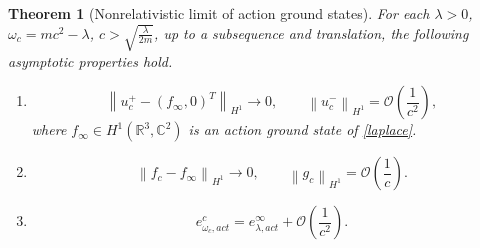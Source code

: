 \documentclass{amsart}
\theoremstyle{plain}
\newtheorem{theorem}{Theorem}[section]
\theoremstyle{definition}
\theoremstyle{remark}
\numberwithin{equation}{section} \numberwithin{figure}{section}
\begin{document}
\begin{theorem}[Nonrelativistic limit of  action ground states]\label{them:1.3}
  \normalfont
  For each $\lambda>0$, $\omega_c= mc^2-\lambda$, $c>\sqrt{\frac{\lambda}{2m}}$, up to a subsequence and translation, the following asymptotic properties hold.
   \begin{enumerate}
    \item 
   \[
  \left\|u_c^+ - (f_\infty, 0)^T\right\|_{H^1} \to 0, \qquad \left\|u_c^-\right\|_{H^1} = \mathcal{O}\left(\frac{1}{c^2}\right),
  \] 
  where \(f_\infty\in H^1(\mathbb{R}^3, \mathbb{C}^2)\) is an action ground state of \eqref{laplace}.
  \item 
  \[
  \left\|f_c - f_\infty\right\|_{H^1} \to 0, \qquad \left\|g_c\right\|_{H^1} = \mathcal{O}\left(\frac{1}{c}\right).
  \]
  \item 
  $$
  e_{\omega_c, act}^c = e_{\lambda, act}^\infty+ \mathcal{O}\left( \frac{1}{c^2}\right).
  $$
  \end{enumerate}

 \end{theorem}
\end{document}
